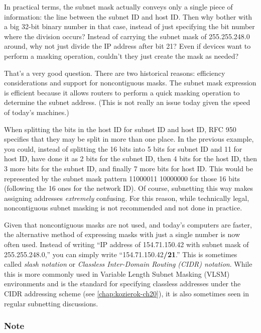 In practical terms, the subnet mask actually conveys only a single piece
of information: the line between the subnet ID and host ID. Then why
bother with a big 32-bit binary number in that case, instead of just
specifying the bit number where the division occurs? Instead of carrying
the subnet mask of 255.255.248.0 around, why not just divide the IP
address after bit 21? Even if devices want to perform a masking
operation, couldn't they just create the mask as needed?

That's a very good question. There are two historical reasons:
efficiency considerations and support for
noncontiguous
masks. The subnet mask expression is efficient because it allows routers
to perform a quick masking operation to determine the subnet address.
(This is not really an issue today given the speed of today's machines.)

When splitting the bits in the host ID for subnet ID and host ID, RFC
950 specifies that they may be split in more than one place. In the
previous example, you could, instead of splitting the 16 bits into 5
bits for subnet ID and 11 for host ID, have done it as 2 bits for the
subnet ID, then 4 bits for the host ID, then 3 more bits for the subnet
ID, and finally 7 more bits for host ID. This would be represented by
the subnet mask pattern 11000011 10000000 for those 16 bits (following
the 16 ones for the network ID). Of course, subnetting this way makes
assigning addresses {\emph{extremely}} confusing. For this reason, while
technically legal, noncontiguous subnet masking is not recommended and
not done in practice.

Given that noncontiguous masks are not used, and today's computers are
faster, the alternative method of expressing masks with just a single
number is now often used. Instead of writing
``IP address of 154.71.150.42 with subnet mask of 255.255.248.0,'' you can simply
write ``154.71.150.42\textbf{/21}.''
This is sometimes called \emph{slash notation} or
\emph{Classless Inter-Domain Routing} {\emph{(CIDR) notation}}.
While this is more commonly used in Variable Length Subnet Masking (VLSM) environments and is the standard for specifying classless addresses under the CIDR addressing scheme (see \vref{chap:kozierok-ch20}), it is also sometimes seen in regular subnetting discussions.

\subsubsection[Note]{\texorpdfstring{Note}{Note}}


